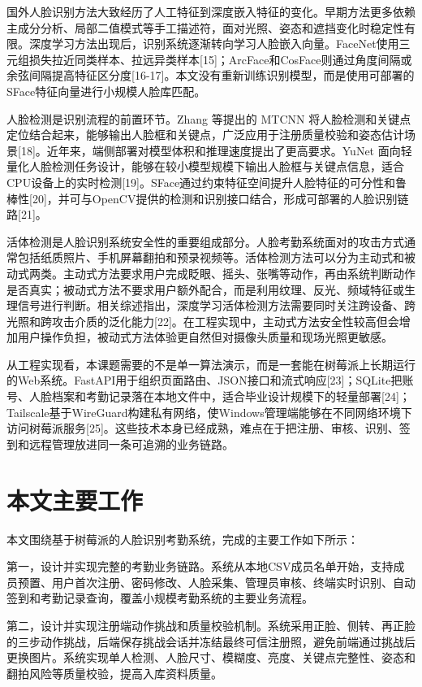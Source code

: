 \documentclass[UTF8]{heuthesis}
\begin{document}
国外人脸识别方法大致经历了人工特征到深度嵌入特征的变化。早期方法更多依赖主成分分析、局部二值模式等手工描述符，面对光照、姿态和遮挡变化时稳定性有限。深度学习方法出现后，识别系统逐渐转向学习人脸嵌入向量。FaceNet使用三元组损失拉近同类样本、拉远异类样本[15]；ArcFace和CosFace则通过角度间隔或余弦间隔提高特征区分度[16-17]。本文没有重新训练识别模型，而是使用可部署的SFace特征向量进行小规模人脸库匹配。

人脸检测是识别流程的前置环节。Zhang 等提出的 MTCNN 将人脸检测和关键点定位结合起来，能够输出人脸框和关键点，广泛应用于注册质量校验和姿态估计场景[18]。近年来，端侧部署对模型体积和推理速度提出了更高要求。YuNet 面向轻量化人脸检测任务设计，能够在较小模型规模下输出人脸框与关键点信息，适合CPU设备上的实时检测[19]。SFace通过约束特征空间提升人脸特征的可分性和鲁棒性[20]，并可与OpenCV提供的检测和识别接口结合，形成可部署的人脸识别链路[21]。

活体检测是人脸识别系统安全性的重要组成部分。人脸考勤系统面对的攻击方式通常包括纸质照片、手机屏幕翻拍和预录视频等。活体检测方法可以分为主动式和被动式两类。主动式方法要求用户完成眨眼、摇头、张嘴等动作，再由系统判断动作是否真实；被动式方法不要求用户额外配合，而是利用纹理、反光、频域特征或生理信号进行判断。相关综述指出，深度学习活体检测方法需要同时关注跨设备、跨光照和跨攻击介质的泛化能力[22]。在工程实现中，主动式方法安全性较高但会增加用户操作负担，被动式方法体验更自然但对摄像头质量和现场光照更敏感。

从工程实现看，本课题需要的不是单一算法演示，而是一套能在树莓派上长期运行的Web系统。FastAPI用于组织页面路由、JSON接口和流式响应[23]；SQLite把账号、人脸档案和考勤记录落在本地文件中，适合毕业设计规模下的轻量部署[24]；Tailscale基于WireGuard构建私有网络，使Windows管理端能够在不同网络环境下访问树莓派服务[25]。这些技术本身已经成熟，难点在于把注册、审核、识别、签到和远程管理放进同一条可追溯的业务链路。

\section{本文主要工作}
本文围绕基于树莓派的人脸识别考勤系统，完成的主要工作如下所示：

第一，设计并实现完整的考勤业务链路。系统从本地CSV成员名单开始，支持成员预置、用户首次注册、密码修改、人脸采集、管理员审核、终端实时识别、自动签到和考勤记录查询，覆盖小规模考勤系统的主要业务流程。

第二，设计并实现注册端动作挑战和质量校验机制。系统采用正脸、侧转、再正脸的三步动作挑战，后端保存挑战会话并冻结最终可信注册照，避免前端通过挑战后更换图片。系统实现单人检测、人脸尺寸、模糊度、亮度、关键点完整性、姿态和翻拍风险等质量校验，提高入库资料质量。
\end{document}
